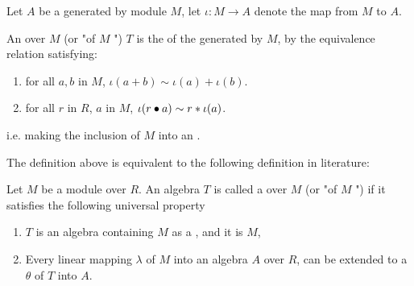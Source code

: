 \begin{definition}
    \label{TensorAlgebra}
    \leanok

    Let $A$ be a  generated by module $M$, let $\iota : M \to A$ denote the map from $M$ to $A$.

    An  over $M$ (or "of $M$ ") $T$ is the  of the  generated by $M$, 
    by the equivalence relation satisfying:

    \begin{enumerate}

    \item for all $a, b$ in $M$, $\iota(a + b) \sim \iota(a) + \iota(b)$.
    \item for all $r$ in $R$, $a$ in $M$, $\iota(r \bullet a) \sim r * \iota(a)$.
    
    \end{enumerate}

    i.e. making the inclusion of $M$ into an .

\end{definition}

\begin{remark}
    \label{mk:TensorAlgebra}

    The definition above is equivalent to the following definition in literature:

    Let $M$ be a module over $R$. An algebra $T$ is called a  over $M$ (or "of $M$ ")
    if it satisfies the following universal property

    \begin{enumerate}
    \item $T$ is an algebra containing $M$ as a , and it is  $M$,
    \item Every linear mapping $\lambda$ of $M$ into an algebra $A$ over $R$, can be extended to 
    a  $\theta$ of $T$ into $A$.
    \end{enumerate}
    
\end{remark}